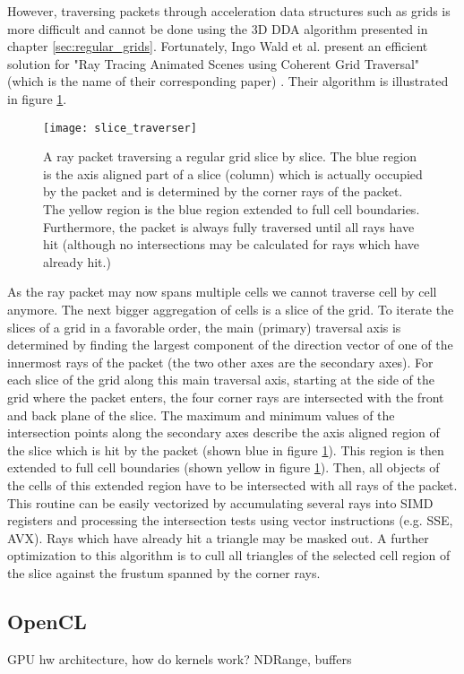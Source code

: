 However, traversing packets through acceleration data structures such as grids is more difficult and cannot be done using the 3D DDA algorithm presented in chapter \ref{sec:regular_grids}. Fortunately, Ingo Wald et al. present an efficient solution for "Ray Tracing Animated Scenes using Coherent Grid Traversal" (which is the name of their corresponding paper) \cite{packet_caster}. Their algorithm is illustrated in figure \ref{fig:slice_traverser}.

\begin{figure}
\centering
\texttt{[image: slice\_traverser]}
\caption{A ray packet traversing a regular grid slice by slice. The blue region is the axis aligned part of a slice (column) which is actually occupied by the packet and is determined by the corner rays of the packet. The yellow region is the blue region extended to full cell boundaries. Furthermore, the packet is always fully traversed until all rays have hit (although no intersections may be calculated for rays which have already hit.)}
\label{fig:slice_traverser} 
\end{figure}

As the ray packet may now spans multiple cells we cannot traverse cell by cell anymore. The next bigger aggregation of cells is a slice of the grid. To iterate the slices of a grid in a favorable order, the main (primary) traversal axis is determined by finding the largest component of the direction vector of one of the innermost rays of the packet (the two other axes are the secondary axes). For each slice of the grid along this main traversal axis, starting at the side of the grid where the packet enters, the four corner rays are intersected with the front and back plane of the slice. The maximum and minimum values of the intersection points along the secondary axes describe the axis aligned region of the slice which is hit by the packet (shown blue in figure \ref{fig:slice_traverser}). This region is then extended to full cell boundaries (shown yellow in figure \ref{fig:slice_traverser}). Then, all objects of the cells of this extended region have to be intersected with all rays of the packet. This routine can be easily vectorized by accumulating several rays into SIMD registers and processing the intersection tests using vector instructions (e.g. SSE, AVX). Rays which have already hit a triangle may be masked out. A further optimization to this algorithm is to cull all triangles of the selected cell region of the slice against the frustum spanned by the corner rays.


\subsection{OpenCL}

GPU hw architecture, how do kernels work? NDRange, buffers
